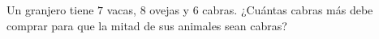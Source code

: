 Un granjero tiene $7$ vacas, $8$ ovejas y $6$ cabras. ¿Cuántas cabras más debe comprar para que la mitad de sus animales sean cabras?